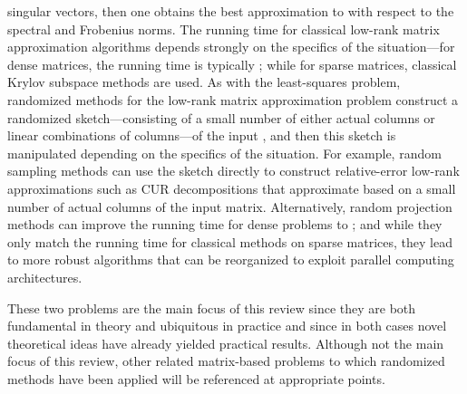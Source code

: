 \documentclass[twoside]{article}
\begin{document}
\begin{itemize}
singular vectors, then one obtains the best approximation to  with 
respect to the spectral and Frobenius norms.
The running time for classical low-rank matrix approximation algorithms 
depends strongly on the specifics of the situation---for dense matrices, the 
running time is typically ; while for sparse matrices, classical 
Krylov subspace methods are used.
As with the least-squares problem, randomized methods for the low-rank matrix
approximation problem construct a randomized sketch---consisting of a small 
number of either actual columns or linear combinations of columns---of the 
input , and then this sketch is manipulated depending on the specifics of 
the situation.
For example, random sampling methods can use the sketch directly to 
construct relative-error low-rank approximations such as CUR decompositions 
that approximate  based on a small number of actual columns of the input 
matrix.
Alternatively, random projection methods can improve the running time for 
dense problems to ; and while they only match the running time 
for classical methods on sparse matrices, they lead to more robust 
algorithms that can be reorganized to exploit parallel computing 
architectures.
\end{itemize}
These two problems are the main focus of this review since they are both 
fundamental in theory and ubiquitous in practice and since in both cases
novel theoretical ideas have already yielded practical results.
Although not the main focus of this review, other related matrix-based 
problems to which randomized methods have been applied will be referenced 
at appropriate points.
\end{document}

